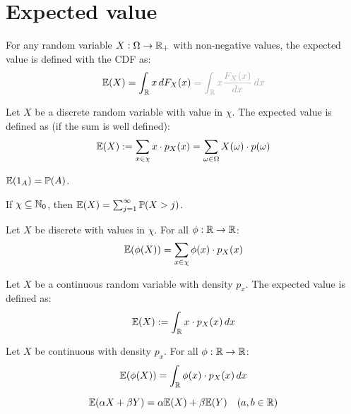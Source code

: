 \section{Expected value}

For any random variable \(X: \Omega \to \mathbb{R}_+\) with non-negative values, the expected value is defined with the CDF as:
\vspace{-8pt}
\[\E(X) = \int_\R x \,dF_X(x) \color{gray!70} = \int_\R x \frac{F_X(x)}{dx} \, dx\]

\begin{ddefinition*}
  Let \(X\) be a discrete random variable with value in \(\chi\). The expected value is defined as (if the sum is well defined):
  \vspace{-10pt}
  \[\mathbb{E}(X) := \sum_{x \in \chi}x \cdot p_X(x) = \sum_{\omega \in \Omega} X(\omega) \cdot p(\omega)\]
\end{ddefinition*}

\begin{proposition}
  {\small \(\mathbb{E}(1_A) = \mathbb{P}(A)\)}.
\end{proposition}

\begin{proposition}
  If \(\chi \subseteq \mathbb{N}_0\), then \(\mathbb{E}(X) = \sum_{j=1}^\infty \mathbb{P}(X > j)\).
\end{proposition}

\begin{dtheorem*}
  Let \(X\) be discrete with values in \(\chi\). For all \(\phi: \mathbb{R} \to \mathbb{R}\):
  \[\mathbb{E}(\phi(X)) = \sum_{x \in \chi}\phi(x) \cdot p_X(x)\]
\end{dtheorem*}

\begin{cdefinition*}
  Let \(X\) be a continuous random variable with density \(p_x\). The expected value is defined as:
  \vspace{-10pt}
  \[\mathbb{E}(X) := \int_{\mathbb{R}} x \cdot p_X(x) \,dx\]
\end{cdefinition*}

\begin{ctheorem*}
  Let \(X\) be continuous with density \(p_x\). For all \(\phi: \mathbb{R} \to \mathbb{R}\):
  \[\mathbb{E}(\phi(X)) = \int_{\mathbb{R}} \phi(x) \cdot p_X(x) \, dx\]
\end{ctheorem*}

\begin{theorem*}
  \[\mathbb{E}(\alpha X + \beta Y) = \alpha \mathbb{E}(X) + \beta \mathbb{E}(Y) \quad (a, b \in \mathbb{R})\]
\end{theorem*}

